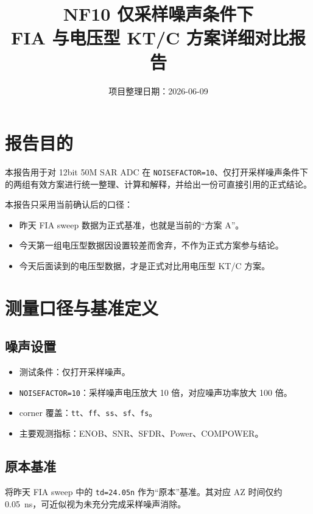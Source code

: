 \documentclass[12pt,a4paper]{ctexart}
\title{\textbf{NF10 仅采样噪声条件下}\\[4pt]\textbf{FIA 与电压型 KT/C 方案详细对比报告}}
\author{项目整理日期：2026-06-09}
\date{}
\begin{document}
\maketitle
\tableofcontents
\newpage

\section{报告目的}

本报告用于对 12bit 50M SAR ADC 在 \texttt{NOISEFACTOR=10}、仅打开采样噪声条件下的两组有效方案进行统一整理、计算和解释，并给出一份可直接引用的正式结论。

本报告只采用当前确认后的口径：

\begin{itemize}
  \item 昨天 FIA sweep 数据为正式基准，也就是当前的“方案 A”。
  \item 今天第一组电压型数据因设置较差而舍弃，不作为正式方案参与结论。
  \item 今天后面读到的电压型数据，才是正式对比用电压型 KT/C 方案。
\end{itemize}

\section{测量口径与基准定义}

\subsection{噪声设置}

\begin{itemize}
  \item 测试条件：仅打开采样噪声。
  \item \texttt{NOISEFACTOR=10}：采样噪声电压放大 10 倍，对应噪声功率放大 100 倍。
  \item corner 覆盖：\texttt{tt}、\texttt{ff}、\texttt{ss}、\texttt{sf}、\texttt{fs}。
  \item 主要观测指标：ENOB、SNR、SFDR、Power、COMPOWER。
\end{itemize}

\subsection{原本基准}

将昨天 FIA sweep 中的 \texttt{td=24.05n} 作为“原本”基准。其对应 AZ 时间仅约 \SI{0.05}{ns}，可近似视为未充分完成采样噪声消除。
\end{document}
